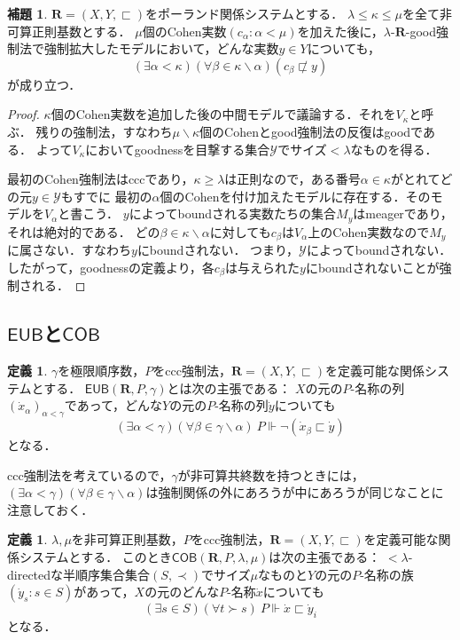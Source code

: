 \documentclass[uplatex,dvipdfmx]{jsarticle}
\newcommand\forces{\Vdash}
\newcommand{\EUB}{\mathsf{EUB}}
\newcommand{\COB}{\mathsf{COB}}
\newcommand{\relR}{\mathbf{R}}
\renewcommand{\setminus}{\smallsetminus}
\theoremstyle{definition}
\newtheorem{defi}[thm]{定義}
\newtheorem{lem}[thm]{補題}
\begin{document}
	\begin{lem}\label{lem:cohenreals}
		$\relR = (X, Y, \sqsubset)$をポーランド関係システムとする．
		$\lambda \le \kappa \le \mu$を全て非可算正則基数とする．
		$\mu$個のCohen実数$(c_\alpha : \alpha < \mu)$を加えた後に，$\lambda$-$\relR$-good強制法で強制拡大したモデルにおいて，どんな実数$y \in Y$についても，
		\[
		(\exists \alpha < \kappa)(\forall \beta \in \kappa \setminus \alpha)(c_\beta \not \sqsubset y)
		\]
		が成り立つ．
	\end{lem}
	\begin{proof}
		$\kappa$個のCohen実数を追加した後の中間モデルで議論する．それを$V_\kappa$と呼ぶ．
		残りの強制法，すなわち$\mu\setminus\kappa$個のCohenとgood強制法の反復はgoodである．
		よって$V_\kappa$においてgoodnessを目撃する集合$\mathcal{Y}$でサイズ${<}\lambda$なものを得る． 

		最初のCohen強制法はcccであり，$\kappa\ge \lambda$は正則なので，ある番号$\alpha\in\kappa$がとれてどの元$y \in \mathcal{Y}$もすでに
		最初の$\alpha$個のCohenを付け加えたモデルに存在する．そのモデルを$V_{\alpha}$と書こう．
		$y$によってboundされる実数たちの集合$M_y$はmeagerであり，それは絶対的である．
		どの$\beta\in\kappa\setminus \alpha$に対しても$c_\beta$は$V_{\alpha}$上のCohen実数なので$M_y$に属さない．すなわち$y$にboundされない．
		つまり，$\mathcal Y$によってboundされない．
		したがって，goodnessの定義より，各$c_\beta$は与えられた$y$にboundされないことが強制される．
	\end{proof}
	
	\subsection{$\EUB$と$\COB$}
	
	\begin{defi}
		$\gamma$を極限順序数，$P$をccc強制法，$\relR = (X, Y, \sqsubset)$を定義可能な関係システムとする．
		$\EUB(\relR, P, \gamma)$とは次の主張である：
		$X$の元の$P$-名称の列$(\dot{x}_\alpha)_{\alpha < \gamma}$であって，どんな$Y$の元の$P$-名称の列$\dot{y}$についても
		\[
		(\exists \alpha < \gamma)(\forall \beta \in \gamma \setminus \alpha)\ P \forces \neg (\dot{x}_\beta \sqsubset \dot{y})
		\]
		となる．
	\end{defi}
	ccc強制法を考えているので，$\gamma$が非可算共終数を持つときには，$(\exists \alpha < \gamma)(\forall \beta \in \gamma \setminus \alpha)$は強制関係の外にあろうが中にあろうが同じなことに注意しておく．
	
	\begin{defi}
		$\lambda, \mu$を非可算正則基数，$P$をccc強制法，$\relR = (X, Y, \sqsubset)$を定義可能な関係システムとする．
		このとき$\COB(\relR, P, \lambda, \mu)$は次の主張である：
		${<}\lambda$-directedな半順序集合集合$(S, \prec)$でサイズ$\mu$なものと$Y$の元の$P$-名称の族$(\dot{y}_s : s \in S)$があって，$X$の元のどんな$P$-名称$\dot{x}$についても
		\[
		(\exists s \in S)(\forall t \succ s) \ P \forces \dot{x} \sqsubset \dot{y}_i
		\]
		となる．
	\end{defi}
\end{document}

